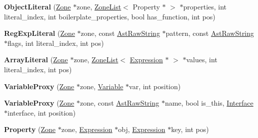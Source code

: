 \begin{DoxyCompactItemize}
\item 
\hypertarget{classv8_1_1internal_1_1_v8___f_i_n_a_l_a2387ef1ab74c3f83630315a883eb1e03}{}{\bfseries Object\+Literal} (\hyperlink{classv8_1_1internal_1_1_zone}{Zone} $\ast$zone, \hyperlink{classv8_1_1internal_1_1_zone_list}{Zone\+List}$<$ Property $\ast$ $>$ $\ast$properties, int literal\+\_\+index, int boilerplate\+\_\+properties, bool has\+\_\+function, int pos)\label{classv8_1_1internal_1_1_v8___f_i_n_a_l_a2387ef1ab74c3f83630315a883eb1e03}

\item 
\hypertarget{classv8_1_1internal_1_1_v8___f_i_n_a_l_a54e0ae515dce22142fc3082ef27341d6}{}{\bfseries Reg\+Exp\+Literal} (\hyperlink{classv8_1_1internal_1_1_zone}{Zone} $\ast$zone, const \hyperlink{classv8_1_1internal_1_1_ast_raw_string}{Ast\+Raw\+String} $\ast$pattern, const \hyperlink{classv8_1_1internal_1_1_ast_raw_string}{Ast\+Raw\+String} $\ast$flags, int literal\+\_\+index, int pos)\label{classv8_1_1internal_1_1_v8___f_i_n_a_l_a54e0ae515dce22142fc3082ef27341d6}

\item 
\hypertarget{classv8_1_1internal_1_1_v8___f_i_n_a_l_a981420ca261bfeaae802f6f698015672}{}{\bfseries Array\+Literal} (\hyperlink{classv8_1_1internal_1_1_zone}{Zone} $\ast$zone, \hyperlink{classv8_1_1internal_1_1_zone_list}{Zone\+List}$<$ \hyperlink{classv8_1_1internal_1_1_expression}{Expression} $\ast$ $>$ $\ast$values, int literal\+\_\+index, int pos)\label{classv8_1_1internal_1_1_v8___f_i_n_a_l_a981420ca261bfeaae802f6f698015672}

\item 
\hypertarget{classv8_1_1internal_1_1_v8___f_i_n_a_l_ae514ce00b5dadb938f5df78e8a7d20d2}{}{\bfseries Variable\+Proxy} (\hyperlink{classv8_1_1internal_1_1_zone}{Zone} $\ast$zone, \hyperlink{classv8_1_1internal_1_1_variable}{Variable} $\ast$var, int position)\label{classv8_1_1internal_1_1_v8___f_i_n_a_l_ae514ce00b5dadb938f5df78e8a7d20d2}

\item 
\hypertarget{classv8_1_1internal_1_1_v8___f_i_n_a_l_a47e00687bad6eed9ff1a55980529ae38}{}{\bfseries Variable\+Proxy} (\hyperlink{classv8_1_1internal_1_1_zone}{Zone} $\ast$zone, const \hyperlink{classv8_1_1internal_1_1_ast_raw_string}{Ast\+Raw\+String} $\ast$name, bool is\+\_\+this, \hyperlink{classv8_1_1internal_1_1_interface}{Interface} $\ast$interface, int position)\label{classv8_1_1internal_1_1_v8___f_i_n_a_l_a47e00687bad6eed9ff1a55980529ae38}

\item 
\hypertarget{classv8_1_1internal_1_1_v8___f_i_n_a_l_a892a6700ee912787b0a2c240f0ace12e}{}{\bfseries Property} (\hyperlink{classv8_1_1internal_1_1_zone}{Zone} $\ast$zone, \hyperlink{classv8_1_1internal_1_1_expression}{Expression} $\ast$obj, \hyperlink{classv8_1_1internal_1_1_expression}{Expression} $\ast$key, int pos)\label{classv8_1_1internal_1_1_v8___f_i_n_a_l_a892a6700ee912787b0a2c240f0ace12e}


\end{DoxyCompactItemize}
